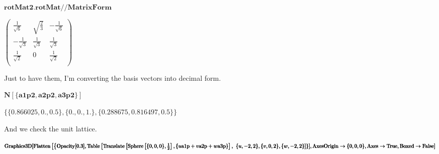 \documentclass{article}
\begin{document}
\begin{doublespace}
\noindent\(\pmb{\text{rotMat2}.\text{rotMat}\text{//}\text{MatrixForm}}\)
\end{doublespace}

\begin{doublespace}
\noindent\(\left(
\begin{array}{ccc}
 \frac{1}{\sqrt{6}} & \sqrt{\frac{2}{3}} & -\frac{1}{\sqrt{6}} \\
 -\frac{1}{\sqrt{3}} & \frac{1}{\sqrt{3}} & \frac{1}{\sqrt{3}} \\
 \frac{1}{\sqrt{2}} & 0 & \frac{1}{\sqrt{2}} \\
\end{array}
\right)\)
\end{doublespace}

Just to have them, I{'}m converting the basis vectors into decimal form.

\begin{doublespace}
\noindent\(\pmb{N[\{\text{a1p2},\text{a2p2},\text{a3p2}\}]}\)
\end{doublespace}

\begin{doublespace}
\noindent\(\{\{0.866025,0.,0.5\},\{0.,0.,1.\},\{0.288675,0.816497,0.5\}\}\)
\end{doublespace}

And we check the unit lattice.

\begin{doublespace}
\noindent\(\pmb{\text{Graphics3D}[}\\
\pmb{\text{Flatten}\left[\left\{\text{Opacity}[0.3],\text{Table}\left[\text{Translate}\left[\text{Sphere}\left[\{0,0,0\},\frac{1}{2}\right],\{u \text{a1p}
+ v \text{a2p} + w \text{a3p}\}\right],\right.\right.\right.}\\
\pmb{\{u,-2,2\},\{v,0,2\},\{w,-2,2\}]\}],\text{AxesOrigin}\to \{0,0,0\},\text{Axes}\to \text{True},\text{Boxed}\to \text{False}]}\)
\end{doublespace}
\end{document}
